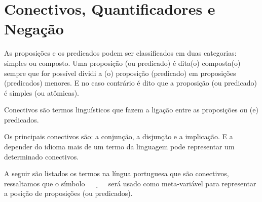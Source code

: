 \section{Conectivos, Quantificadores e Negação}\label{sec:LogicsConnectives}

As proposições e os predicados podem ser classificados em duas categorias: simples ou composto. Uma proposição (ou predicado) é dita(o) composta(o) sempre que for possível dividi a (o) proposição (predicado) em proposições (predicados) menores. E no caso contrário é dito que a proposição (ou predicado) é simples (ou atômicas).

\begin{definicao}[Conectivos]\label{def:Conectivos}
	Conectivos são termos linguísticos que fazem a ligação entre as proposições ou (e) predicados.
\end{definicao}

Os principais conectivos são: a conjunção, a disjunção e a implicação. E a depender do idioma mais de um termo da linguagem pode representar um determinado conectivos.

A seguir são listados os termos na língua portuguesa que são conectivos, ressaltamos que o símbolo $\underline{ \ \ \ \ \ \ \ \ \ \ \ \ }$ será usado como meta-variável para representar a posição de proposições (ou predicados).

